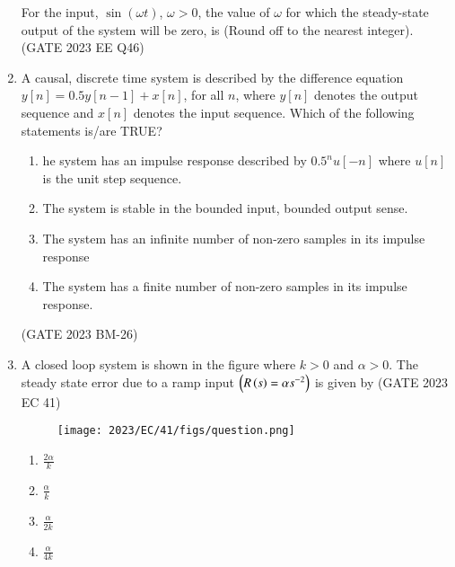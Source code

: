 \begin{enumerate}[label=\thechapter.\arabic*,ref=\thechapter.\theenumi]
For the input, $\sin(\omega t)$, $\omega > 0$, the value of $\omega$ for which the steady-state output of the system will be zero, is \underline{\hspace{2cm}} (Round off to the nearest integer).
\hfill(GATE 2023 EE Q46)\\
\solution

\newpage

\item A causal, discrete time system is described by the difference equation $y[n] = 0.5 y[n-1] + x[n]$, for all $n$, where $y[n]$ denotes the output sequence and $x[n]$ denotes the input sequence. Which of the following statements is/are TRUE?

\begin{enumerate}[label = (\alph*)]
	\item he system has an impulse response described by $0.5^{n} u[-n]$ where $u[n]$ is the  
unit step sequence. 		
	\item The system is stable in the bounded input, bounded output sense.
	\item The system has an infinite number of non-zero samples in its impulse response
	\item The system has a finite number of non-zero samples in its impulse response.
\end{enumerate}

\hfill(GATE 2023 BM-26)\\
\solution
\newpage

\item A closed loop system is shown in the figure where $k>0$ and $\alpha>0$. The steady state
error due to a ramp input $\left(R\left(s\right) = \alpha s^{-2}\right)$  is given by \hfill{(GATE 2023 EC 41)}

\begin{figure}[ht]
\centering
    \texttt{[image: 2023/EC/41/figs/question.png]}
\end{figure}
\begin{enumerate}[label = (\alph*)]
  \item $\frac{2\alpha}{k}$    
  \item $\frac{\alpha}{k}$
  \item $\frac{\alpha}{2k}$
  \item $\frac{\alpha}{4k}$
\end{enumerate}
    
\solution
\newpage

\end{enumerate}
